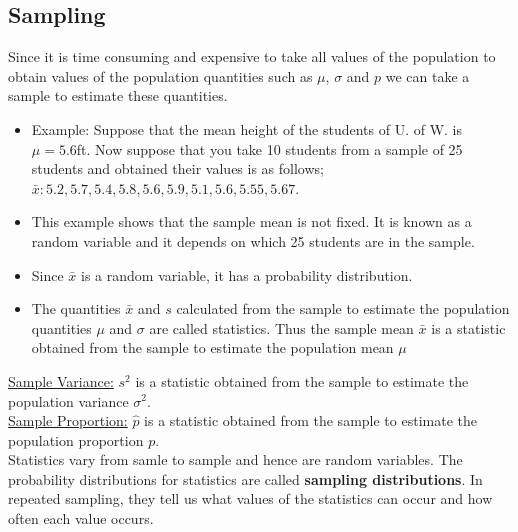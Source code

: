 \documentclass[12pt, letterpaper]{article}
\begin{document}
        \subsection{Sampling}
            Since it is time consuming and expensive to take all values of the population to obtain values of the population quantities such as $\mu$, $\sigma$ and $p$ we can take a sample to estimate these quantities.
            \begin{itemize}
                \item Example: Suppose that the mean height of the students of U. of W. is \\$\mu = 5.6$ft. Now suppose that you take 10 students from a sample of 25 \\students and obtained their values is as follows; \\$\bar{x}: 5.2, 5.7, 5.4, 5.8, 5.6, 5.9, 5.1, 5.6, 5.55, 5.67$.
                \item This example shows that the sample mean is not fixed. It is known as a random variable and it depends on which 25 students are in the sample.
                \item Since $\bar{x}$ is a random variable, it has a probability distribution.
                \item The quantities $\bar{x}$ and $s$ calculated from the sample to estimate the population quantities $\mu$ and $\sigma$ are called statistics. Thus the sample mean $\bar{x}$ is a statistic obtained from the sample to estimate the population mean $\mu$
            \end{itemize}
            \underline{Sample Variance:} $s^2$ is a statistic obtained from the sample to estimate the population variance $\sigma^2$.
            \\ \underline{Sample Proportion:} $\hat{p}$ is a statistic obtained from the sample to estimate the population proportion $p$.
            \\ Statistics vary from samle to sample and hence are random variables. The probability distributions for statistics are called \textbf{sampling distributions}. In repeated sampling, they tell us what values of the statistics can occur and how often each value occurs.
\end{document}
